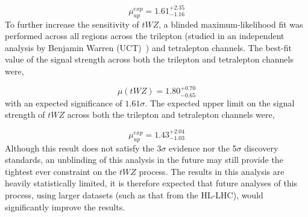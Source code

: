 \begin{equation}
  \mu_{up}^{exp} =   1.61^{+2.35}_{-1.16}
\end{equation}
To further increase the sensitivity of $tWZ$, a blinded maximum-likelihood fit was performed across all regions across the trilepton (studied in an independent analysis by Benjamin Warren (UCT)~\cite{ben-thesis}) and tetralepton channels. The best-fit value of the signal strength across both the trilepton and tetralepton channels were,

\begin{equation}
  \mu (tWZ) =   1.80^{+0.70}_{-0.65}
\end{equation}
with an expected significance of $1.61\sigma$. The expected upper limit on the signal strength of $tWZ$ across both the trilepton and tetralepton channels were,

\begin{equation}
  \mu_{up}^{exp} =   1.43^{+2.04}_{-1.03}
\end{equation}
Although this result does not satisfy the 3$\sigma$ evidence nor the 5$\sigma$ discovery standards, an unblinding of this analysis in the future may still provide the tightest ever constraint on the $tWZ$ process. The results in this analysis are heavily statistically limited, it is therefore expected that future analyses of this process, using larger datasets (such as that from the HL-LHC), would significantly improve the results.











